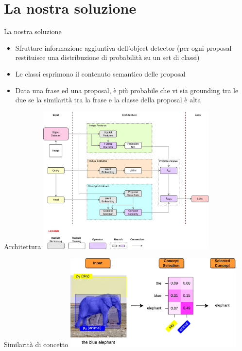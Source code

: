 \documentclass{beamer}
\begin{document}
\section{La nostra soluzione}

\begin{frame}{La nostra soluzione}
  \begin{itemize}
    \item Sfruttare informazione aggiuntiva dell'object detector (per
    ogni proposal restituisce una \alert{distribuzione di probabilità}
    su un set di classi)
    \item Le classi esprimono il \alert{contenuto semantico} delle
    proposal
    \item Data una frase ed una proposal, è più probabile che vi sia
    grounding tra le due se la \alert{similarità} tra la frase e la
    classe della proposal è alta
  \end{itemize}
\end{frame}

\begin{frame}{Architettura}
  \centering
  \includegraphics[width=9cm]{images/model-architecture.png}
\end{frame}

\begin{frame}{Similarità di concetto}
  \centering
  \includegraphics[width=9cm]{images/concept-selection-example.png}
\end{frame}
\end{document}
